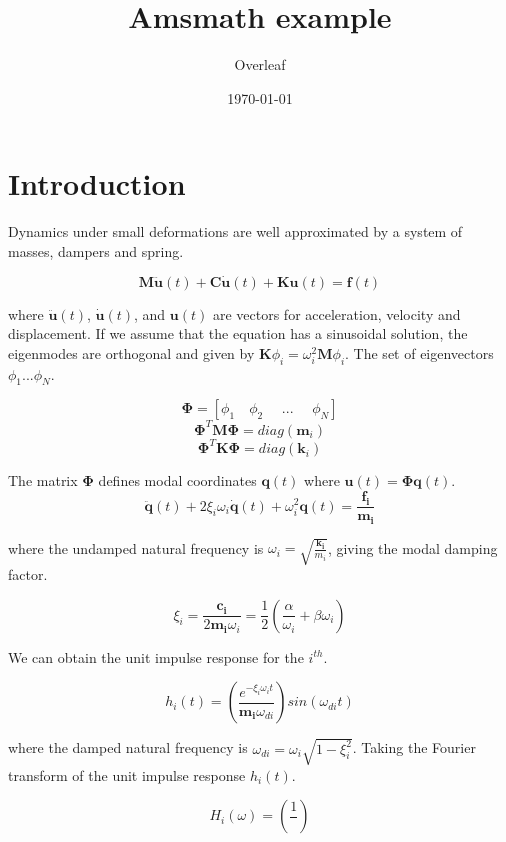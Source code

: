 \documentclass{article}
\title{Amsmath example}
\author{Overleaf}
\date{\today}
\begin{document}
\maketitle
\section{Introduction}

Dynamics under small deformations are well approximated by a system of masses, dampers and spring.

\begin{equation*}
    \mathbf{M\ddot{u}}(t) + \mathbf{C\dot{u}}(t) + \mathbf{Ku}(t) = \mathbf{f}(t)
\end{equation*}

where $\mathbf{\ddot{u}}(t)$, $\mathbf{\dot{u}}(t)$, and $\mathbf{u}(t)$ are vectors for acceleration, velocity and displacement. If we assume that the equation has a sinusoidal solution, the eigenmodes are orthogonal and given by $\mathbf{K} \phi_{i} = \omega^{2}_{i} \mathbf{M} \phi_{i}$. The set of eigenvectors $\phi_{1} \text{...} \phi_{N}$.

\begin{equation*}
    \mathbf{\Phi} = \left[\phi_{1} \quad \phi_{2} \quad \text{ ... } \quad \phi_{N}\right]
\end{equation*}
\begin{equation*}
    \mathbf{\Phi}^{T}\mathbf{M\Phi} = diag(\mathbf{m}_{i})
\end{equation*}
\begin{equation*}
    \mathbf{\Phi}^{T}\mathbf{K\Phi} = diag(\mathbf{k}_{i})
\end{equation*}

The matrix $\mathbf{\Phi}$ defines modal coordinates $\mathbf{q}(t)$ where $\mathbf{u}(t) = \mathbf{\Phi q}(t)$.
\begin{equation*}
    \mathbf{\ddot{q}}(t) + 2\xi_{i}\omega_{i}\mathbf{\dot{q}}(t) + \omega_{i}^{2}\mathbf{q}(t) = \frac{\mathbf{f_{i}}}{\mathbf{m_{i}}}
\end{equation*}

where the undamped natural frequency is $\omega_{i} = \sqrt{\frac{\mathbf{k_{i}}}{m_{i}}}$, giving the modal damping factor.

\begin{equation*}
    \xi_{i} = \frac{\mathbf{c_{i}}}{2\mathbf{m_{i}}\omega_{i}} = \frac{1}{2}\left(\frac{\alpha}{\omega_{i}} + \beta\omega_{i}\right)
\end{equation*}

We can obtain the unit impulse response for the $i^{th}$.

\begin{equation*}
    h_{i}(t) = \left(\frac{e^{-\xi_{i}\omega_{i}t}}{\mathbf{m_{i}}\omega_{di}}\right) sin{(\omega_{di}t)}
\end{equation*}

where the damped natural frequency is $\omega_{di} = \omega_{i} \sqrt{1 - \xi^{2}_{i}}$. Taking the Fourier transform of the unit impulse response $h_{i}(t)$.

\begin{equation*}
    H_{i}(\omega) = \left(\frac{1}{}\right)
\end{equation*}
\end{document}
